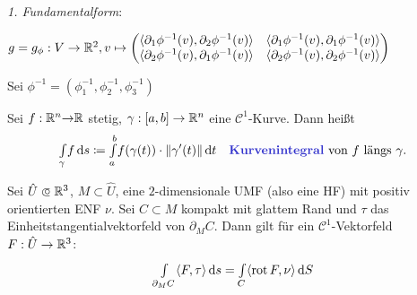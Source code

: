 \documentclass{cheat-sheet}
\DeclareMathOperator{\rot}{rot} %
\newcommand{\Cont}{\mathcal{C}} %
\theoremstyle{definition}
\newcommand{\Intdf}[2]{{\textstyle \int\limits_{#1}} #2} %
\newcommand{\scp}[2]{\langle #1 , #2 \rangle} %
\begin{document}
  \emph{1. Fundamentalform}:

  $g = g_\phi : V \to \R^2, v \mapsto \begin{pmatrix} \scp{\partial_1 \phi^{-1}(v)}{\partial_2 \phi^{-1}(v)} & \scp{\partial_1 \phi^{-1}(v)}{\partial_1 \phi^{-1}(v)} \\ \scp{\partial_2 \phi^{-1}(v)}{\partial_1 \phi^{-1}(v)} & \scp{\partial_2 \phi^{-1}(v)}{\partial_2 \phi^{-1}(v)} \end{pmatrix}$

  Sei $\phi^{-1} = (\phi_1^{-1}, \phi_2^{-1}, \phi_3^{-1})$
\fi



\iffalse
  Sei $M \subset \R^n$ eine $1$-dimensionale UMF, $\omega = \sum_{j=1}^n F_j \d x_j = F \cdot \d \vec{s}$ mit $F = (F_1, \ldots, F_n)^T$ eine stetige $1$-Form auf $\R^n$.

  Sei $(\phi, U)$ eine Karte von $M$, $U$ zusammmenhängend, dann $\phi(U) =: V \opn \R^1$ ebenfalls zusammenhängend, \dh{} $V = \ointerval{a}{b}$. Dann ist
  \[ \phi^{-1} : \ointerval{a}{b} \to \R^n, \quad t \mapsto \left( \phi_1^{-1}(t), \ldots, \phi_n^{-1}(t) \right)^T \]
  eine glatte reguläre Kurve.
  \[ (\phi^{-1})^* \omega = \sum_{j=1}^n (F_j \circ \phi^{-1}) \d \phi_j^{-1} = \sum_{j=1}^n (F_j \circ \phi^{-1}) (\phi_j^{-1})' \d t \]
  \[ (\phi^{-1})^* (F \cdot \d \vec{s}) = \langle F \circ \phi^{-1}, (\phi^{-1})' \rangle \]
  Also:
  \[ \Intdf{U}{\omega} = \Intdf{\ointerval{a}{b}}{(\phi^{-1})^* \omega} = \Int{\ointerval{a}{b}}{}{\langle F \circ \phi^{-1} , (\phi^{-1})' \rangle}{\lambda_1} = \Int{a}{b}{\langle (F \circ \phi^{-1})(t) , (\phi^{-1})'(t) \rangle}{t} = \Int{a}{b}{\langle F(\phi^{-1}(t)) , \tau(t) \rangle \norm{(\phi^{-1})'(t)}}{t}, \]
  wobei $\tau(t) = \tfrac{(\phi^{-1})'(t)}{\norm{(\phi^{-1})'(t)}}$ ein positiv orientierter Einheitstangentialvektor
\fi

\begin{defn}
  Sei $f : \mathbb{R}^n {\to} \mathbb{R}$ stetig, $\gamma : \left[ a, b \right] \to \mathbb{R}^n$ eine $\Cont^1$-Kurve. Dann heißt
  \[
    \Int{\gamma}{}{f}{s} \coloneqq \Int{a}{b}{f(\gamma(t)) \cdot \norm{\gamma'(t)}}{t} \quad
    \text{\emph{Kurvenintegral} von $f$ längs $\gamma$.}
  \]
\end{defn}

\begin{satz}
  Sei $\hat{U} \opn \R^3$, $M \subset \hat{U}$, eine $2$-dimensionale UMF (also eine HF) mit positiv orientierten ENF $\nu$. Sei $C \subset M$ kompakt mit glattem Rand und $\tau$ das Einheitstangentialvektorfeld von $\partial_M C$. Dann gilt für ein $\Cont^1$-Vektorfeld $F : \hat{U} \to \mathbb{R}^3$:
  \[ \Int{\partial_M C}{}{\langle F, \tau \rangle}{s} = \Int{C}{}{\langle \rot F, \nu \rangle}{S} \]
\end{satz}
\end{document}
